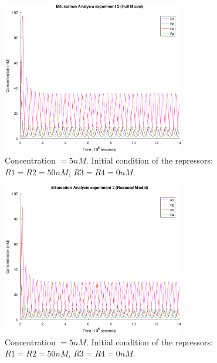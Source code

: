     \begin{figure}[!htbp]
      \centering
      \includegraphics[width=0.71\textwidth]{img/bifurcation-2-full-1.png}
      \caption{Concentration $= 5nM$. Initial condition of the repressors: $R1 = R2 = 50nM$, $R3 = R4 = 0nM$.}
      \label{fig.bifurcation-2-full}
    \end{figure}

    \begin{figure}[!htbp]
      \centering
      \includegraphics[width=0.71\textwidth]{img/bifurcation-2-qssa-1.png}
      \caption{Concentration $= 5nM$. Initial condition of the repressors: $R1 = R2 = 50nM$, $R3 = R4 = 0nM$.}
      \label{fig.bifurcation-2-qssa}
    \end{figure}

